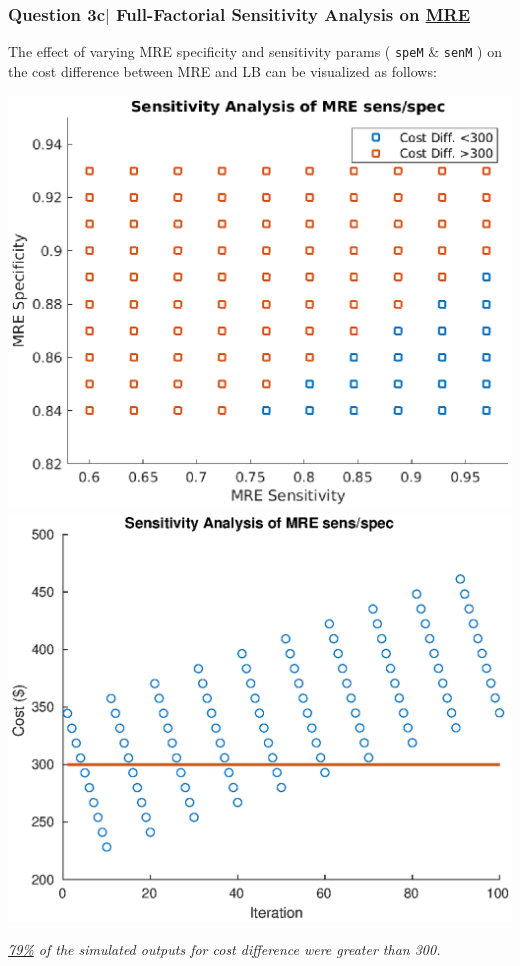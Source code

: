 \documentclass[aspectratio=1610]{beamer}
\begin{document}
\begin{frame}[fragile]
\frametitle{Question 3c$|$ Full-Factorial Sensitivity Analysis on \underline{MRE}}

The effect of varying MRE specificity and sensitivity params ( \verb|speM| \& \verb|senM| ) on the cost difference between MRE and LB can be visualized as follows:
\vspace{1.5em}

\centering
\includegraphics[width = .49\textwidth]{3c_1}
\includegraphics[width = .49\textwidth]{3c_2}

\textit{\underline{79\%} of the simulated outputs for cost difference were greater than 300.}

\end{frame}
\end{document}
